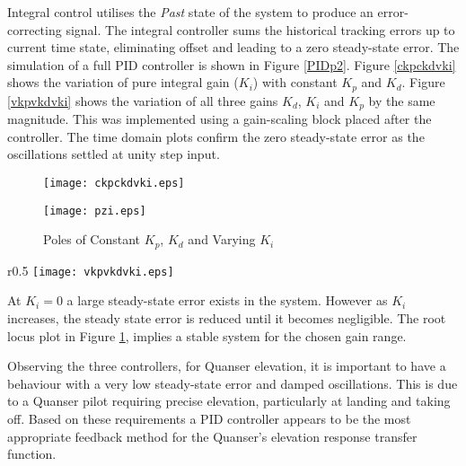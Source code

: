Integral control utilises the \emph{Past} state of the system to produce
an error-correcting signal. The integral controller sums the historical
tracking errors up to current time state, eliminating offset and leading
to a zero steady-state error. The simulation of a full PID controller is
shown in Figure \ref{PIDp2}. Figure \ref{ckpckdvki} shows the variation
of pure integral gain (\(K_i\)) with constant \(K_p\) and \(K_d\).
Figure \ref{vkpvkdvki} shows the variation of all three gains \(K_d\),
\(K_i\) and \(K_p\) by the same magnitude. This was implemented using a
gain-scaling block placed after the controller. The time domain plots
confirm the zero steady-state error as the oscillations settled at unity
step input.

\begin{figure}[h]
\centering
\begin{minipage}{.465\textwidth}
 \centering
 \texttt{[image: ckpckdvki.eps]}
 \caption{Time-Domain Response For Constant $K_p$, $K_d$ and Varying $K_i$}
 \label{ckpckdvki}
\end{minipage}
\hfill
\begin{minipage}{.465\textwidth}
\centering
\texttt{[image: pzi.eps]}
\caption{Poles of Constant $K_p$, $K_d$ and Varying $K_i$}
\label{pzi}
\end{minipage}
\vspace{-15pt}
\end{figure}

\begin{wrapfigure}{r}{0.5\textwidth}
\centering
\vspace{-5pt} %
\texttt{[image: vkpvkdvki.eps]}
\vspace{-10pt}
\caption{Time-Domain Response For Varying $K_p$, $K_d$ and $K_i$}
  \label{vkpvkdvki}
\vspace{-35pt}
\end{wrapfigure}

At \(K_i = 0\) a large steady-state error exists in the system. However
as \(K_i\) increases, the steady state error is reduced until it becomes
negligible. The root locus plot in Figure \ref{pzi}, implies a stable
system for the chosen gain range.

Observing the three controllers, for Quanser elevation, it is important
to have a behaviour with a very low steady-state error and damped
oscillations. This is due to a Quanser pilot requiring precise
elevation, particularly at landing and taking off. Based on these
requirements a PID controller appears to be the most appropriate
feedback method for the Quanser's elevation response transfer function.

